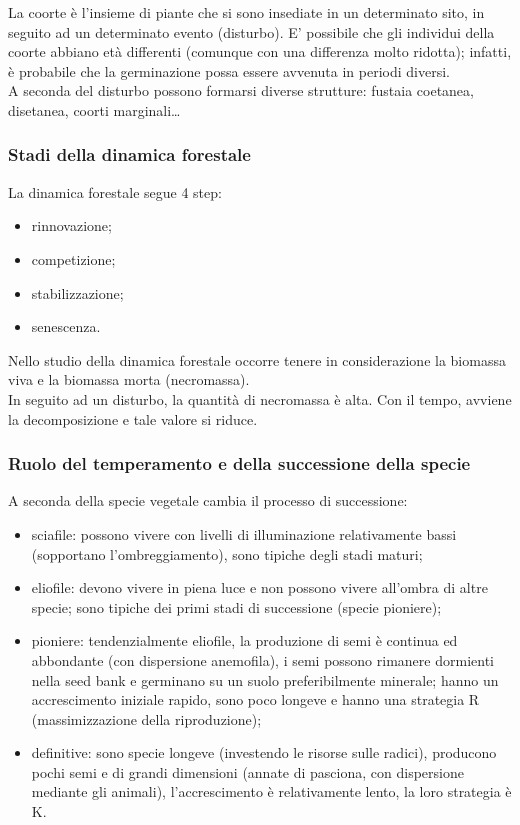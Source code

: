 \documentclass{article}
\begin{document}
La coorte è l'insieme di piante che si sono insediate in un determinato sito, in seguito ad un determinato evento (disturbo). E' possibile che gli individui della coorte abbiano età differenti (comunque con una differenza molto ridotta); infatti, è probabile che la germinazione possa essere avvenuta in periodi diversi.\\
A seconda del disturbo possono formarsi diverse strutture: fustaia coetanea, disetanea, coorti marginali\dots
\subsubsection{Stadi della dinamica forestale}
La dinamica forestale segue 4 step:
\begin{itemize}
    \item rinnovazione;
    \item competizione;
    \item stabilizzazione;
    \item senescenza.
\end{itemize}
Nello studio della dinamica forestale occorre tenere in considerazione la biomassa viva e la biomassa morta (necromassa).\\
In seguito ad un disturbo, la quantità di necromassa è alta. Con il tempo, avviene la decomposizione e tale valore si riduce.
\subsubsection{Ruolo del temperamento e della successione della specie}
A seconda della specie vegetale cambia il processo di successione:
\begin{itemize}
    \item sciafile: possono vivere con livelli di illuminazione relativamente bassi (sopportano l'ombreggiamento), sono tipiche degli stadi maturi;
    \item eliofile: devono vivere in piena luce e non possono vivere all'ombra di altre specie; sono tipiche dei primi stadi di successione (specie pioniere);
    \item pioniere: tendenzialmente eliofile, la produzione di semi è continua ed abbondante (con dispersione anemofila), i semi possono rimanere dormienti nella seed bank e germinano su un suolo preferibilmente minerale; hanno un accrescimento iniziale rapido, sono poco longeve e hanno una strategia R (massimizzazione della riproduzione);
    \item definitive: sono specie longeve (investendo le risorse sulle radici), producono pochi semi e di grandi dimensioni (annate di pasciona, con dispersione mediante gli animali), l'accrescimento è relativamente lento, la loro strategia è K.
\end{itemize}
\end{document}

